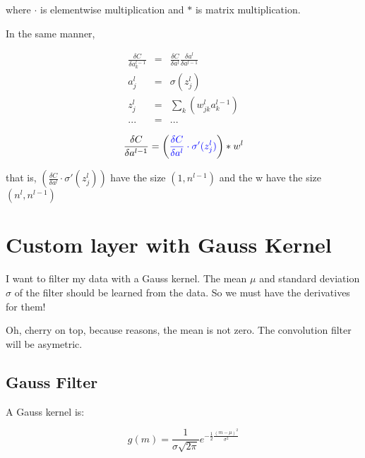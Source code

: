 \documentclass{article}
\begin{document}
where $\cdot$ is elementwise multiplication and $*$ is matrix multiplication.

In the same manner,

\begin{eqnarray}
	\frac{\delta C}{\delta a^{l-1}_k}&=&\frac{\delta C}{\delta a^l} \frac{\delta a^l}{\delta a^{l-1}}\\
	a^l_j&=&\sigma (z^l_j)\\
	z_j^l&=&\sum_{k}\left( w_{jk}^l a^{l-1}_k  \right)\\
	... &=& ...
\end{eqnarray}

\begin{equation}
	\frac{\delta C}{\delta a^{l-1}} = \left( \textcolor{blue}{\frac{\delta C}{\delta a^l} \cdot \sigma ' (z^l_j)} \right) *w^{l}
\end{equation}

that is, $\left(\frac{\delta C}{\delta a^l} \cdot \sigma ' (z^l_j) \right)$ have the size $(1, n^{l-1})$ and
the w have the size $(n^l, n^{l-1})$ \\


\section{Custom layer with Gauss Kernel}

I want to filter my data with a Gauss kernel. The mean $\mu$ and standard deviation $\sigma$ of the filter should be learned from the data. So we must have the derivatives for them!

Oh, cherry on top, because reasons, the mean is not zero. The convolution filter will be asymetric.

\subsection{Gauss Filter}

A Gauss kernel is:

\begin{equation}
	g(m) = \frac{1}{\sigma \sqrt{2 \pi}}e^{-\frac{1}{2} \frac{(m - \mu)^2}{\sigma^2}}
\end{equation}
\end{document}
